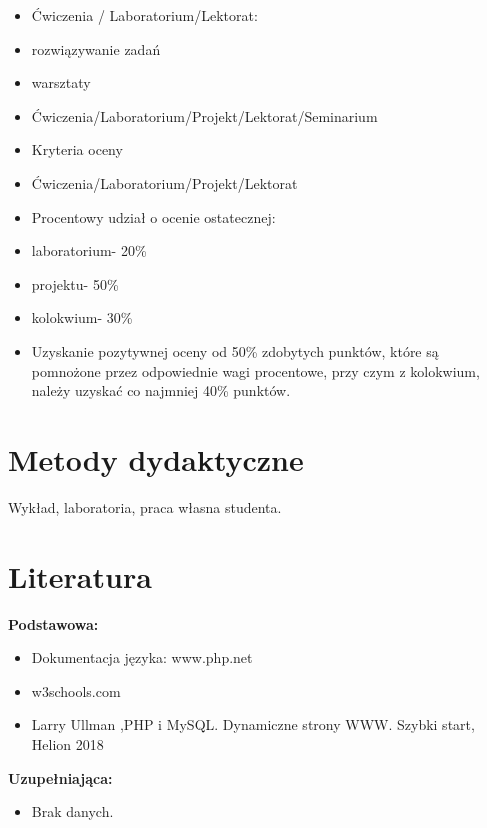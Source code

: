 \documentclass[12pt, a4paper]{article}
\begin{document}
\begin{itemize}
  \item Ćwiczenia / Laboratorium/Lektorat:
  \item rozwiązywanie zadań
  \item warsztaty
  \item Ćwiczenia/Laboratorium/Projekt/Lektorat/Seminarium
  \item Kryteria oceny
  \item Ćwiczenia/Laboratorium/Projekt/Lektorat
  \item Procentowy udział o ocenie ostatecznej:
  \item laboratorium- 20\%
  \item projektu- 50\%
  \item kolokwium- 30\%
  \item Uzyskanie pozytywnej oceny od 50\% zdobytych punktów, które są pomnożone przez odpowiednie wagi procentowe, przy czym z kolokwium,  należy uzyskać co najmniej 40\% punktów.
\end{itemize}

\section{Metody dydaktyczne}

Wykład, laboratoria, praca własna studenta.

\section{Literatura}

\textbf{Podstawowa:}
\begin{itemize}
  \item Dokumentacja języka: www.php.net
  \item w3schools.com
  \item Larry Ullman ,PHP i MySQL. Dynamiczne strony WWW. Szybki start, Helion 2018
\end{itemize}

\textbf{Uzupełniająca:}
\begin{itemize}
  \item Brak danych.
\end{itemize}
\end{document}
